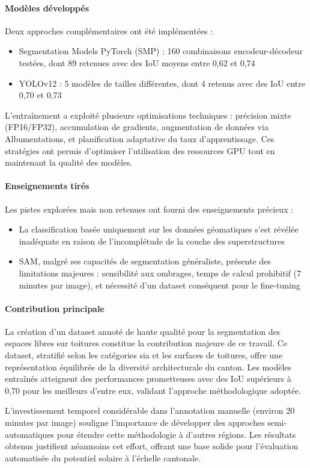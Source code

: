 \paragraph{Modèles développés}
Deux approches complémentaires ont été implémentées :
\begin{itemize}
    \item Segmentation Models PyTorch (SMP) : 160 combinaisons encodeur-décodeur testées, dont 89 retenues avec des IoU moyens entre 0,62 et 0,74
    \item YOLOv12 : 5 modèles de tailles différentes, dont 4 retenus avec des IoU entre 0,70 et 0,73
\end{itemize}

L'entraînement a exploité plusieurs optimisations techniques : précision mixte\\(FP16/FP32), accumulation de gradients, augmentation de données via Albumentations, et planification adaptative du taux d'apprentissage. Ces stratégies ont permis d'optimiser l'utilisation des ressources GPU tout en maintenant la qualité des modèles.

\paragraph{Enseignements tirés}
Les pistes explorées mais non retenues ont fourni des enseignements précieux :
\begin{itemize}
    \item La classification basée uniquement sur les données géomatiques s'est révélée inadéquate en raison de l'incomplétude de la couche des superstructures
    \item SAM, malgré ses capacités de segmentation généraliste, présente des limitations majeures : sensibilité aux ombrages, temps de calcul prohibitif (7 minutes par image), et nécessité d'un dataset conséquent pour le fine-tuning
\end{itemize}

\paragraph{Contribution principale}
La création d'un dataset annoté de haute qualité pour la segmentation des espaces libres sur toitures constitue la contribution majeure de ce travail. Ce dataset, stratifié selon les catégories \gls{sia} et les surfaces de toitures, offre une représentation équilibrée de la diversité architecturale du canton. Les modèles entraînés atteignent des performances prometteuses avec des IoU supérieurs à 0,70 pour les meilleurs d'entre eux, validant l'approche méthodologique adoptée.

L'investissement temporel considérable dans l'annotation manuelle (environ 20 minutes par image) souligne l'importance de développer des approches semi-automatiques pour étendre cette méthodologie à d'autres régions. Les résultats obtenus justifient néanmoins cet effort, offrant une base solide pour l'évaluation automatisée du potentiel solaire à l'échelle cantonale.
